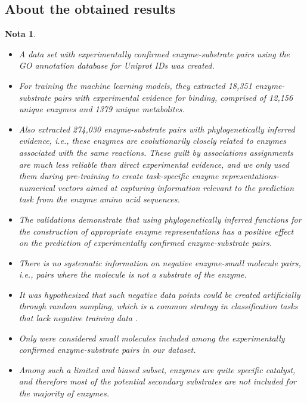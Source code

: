 \documentclass[12pt]{article}
\newtheorem{Note}{Nota}%
\begin{document}
\subsection{About the obtained results}

\begin{Note}
\begin{itemize}


\item A data set with experimentally confirmed enzyme-substrate pairs using the GO annotation database  for Uniprot IDs\cite{2.41} was created.

\item For training the machine learning models, they extracted 18,351 enzyme-substrate pairs with experimental evidence for binding, comprised of 12,156 unique enzymes and 1379 unique metabolites. 

\item Also extracted 274,030 enzyme-substrate pairs with phylogenetically inferred evidence, i.e., these enzymes are evolutionarily closely related to enzymes associated with the same reactions. These guilt by associations assignments are much less reliable than direct experimental evidence, and we only used them during pre-training to create task-specific enzyme representations-numerical vectors aimed at capturing information relevant to the prediction task from the enzyme amino acid sequences. 

\item The validations demonstrate that using phylogenetically inferred functions for the construction of appropriate enzyme representations has a positive effect on the prediction of experimentally confirmed enzyme-substrate pairs.

\item There is no systematic information on negative enzyme-small molecule pairs, i.e., pairs where the molecule is not a substrate of the enzyme.

\item It was hypothesized that such negative data points could be created  artificially through random sampling, which is a common strategy in  classification tasks that lack negative training data \cite{2.42}.


\item Only were considered small molecules included among the experimentally confirmed enzyme-substrate pairs in our dataset. 

\item Among such a limited and biased subset, enzymes are quite specific catalyst, and therefore most of the potential secondary substrates are not included for the majority of enzymes.


\end{itemize}
\end{Note}
\end{document}
